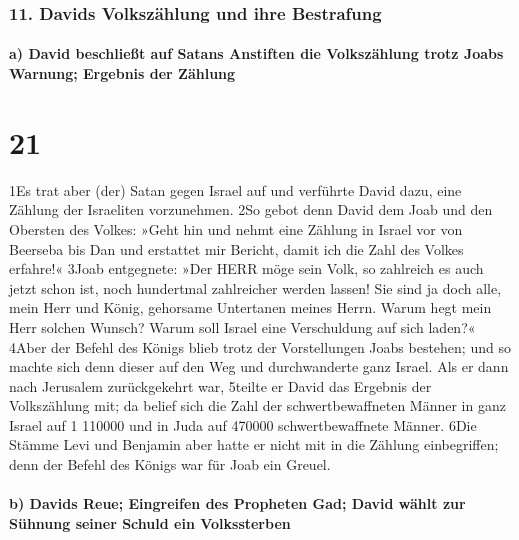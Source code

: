 \hypertarget{davids-volkszuxe4hlung-und-ihre-bestrafung}{%
\subsubsection{11. Davids Volkszählung und ihre
Bestrafung}\label{davids-volkszuxe4hlung-und-ihre-bestrafung}}

\hypertarget{a-david-beschlieuxdft-auf-satans-anstiften-die-volkszuxe4hlung-trotz-joabs-warnung-ergebnis-der-zuxe4hlung}{%
\paragraph{a) David beschließt auf Satans Anstiften die Volkszählung
trotz Joabs Warnung; Ergebnis der
Zählung}\label{a-david-beschlieuxdft-auf-satans-anstiften-die-volkszuxe4hlung-trotz-joabs-warnung-ergebnis-der-zuxe4hlung}}

\hypertarget{section-20}{%
\section{21}\label{section-20}}

1Es trat aber (der) Satan gegen Israel auf und verführte David dazu,
eine Zählung der Israeliten vorzunehmen. 2So gebot denn David dem Joab
und den Obersten des Volkes: »Geht hin und nehmt eine Zählung in Israel
vor von Beerseba bis Dan und erstattet mir Bericht, damit ich die Zahl
des Volkes erfahre!« 3Joab entgegnete: »Der HERR möge sein Volk, so
zahlreich es auch jetzt schon ist, noch hundertmal zahlreicher werden
lassen! Sie sind ja doch alle, mein Herr und König, gehorsame Untertanen
meines Herrn. Warum hegt mein Herr solchen Wunsch? Warum soll Israel
eine Verschuldung auf sich laden?« 4Aber der Befehl des Königs blieb
trotz der Vorstellungen Joabs bestehen; und so machte sich denn dieser
auf den Weg und durchwanderte ganz Israel. Als er dann nach Jerusalem
zurückgekehrt war, 5teilte er David das Ergebnis der Volkszählung mit;
da belief sich die Zahl der schwertbewaffneten Männer in ganz Israel auf
1 110000 und in Juda auf 470000 schwertbewaffnete Männer. 6Die Stämme
Levi und Benjamin aber hatte er nicht mit in die Zählung einbegriffen;
denn der Befehl des Königs war für Joab ein Greuel.

\hypertarget{b-davids-reue-eingreifen-des-propheten-gad-david-wuxe4hlt-zur-suxfchnung-seiner-schuld-ein-volkssterben}{%
\paragraph{b) Davids Reue; Eingreifen des Propheten Gad; David wählt zur
Sühnung seiner Schuld ein
Volkssterben}\label{b-davids-reue-eingreifen-des-propheten-gad-david-wuxe4hlt-zur-suxfchnung-seiner-schuld-ein-volkssterben}}

